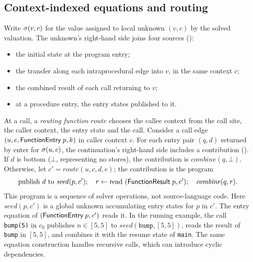 \subsection{Context-indexed equations and routing}

Write $\sigma(v,c)$ for the value assigned to local unknown $(v,c)$ by the
solved valuation. The unknown's right-hand side joins four sources ():
\begin{itemize}
  \item the initial state at the program entry;
  \item the transfer along each intraprocedural edge into $v$, in the same
    context $c$;
  \item the combined result of each call returning to $v$;
  \item at a procedure entry, the entry states published to it.
\end{itemize}
At a call, a \emph{routing function} $\mathit{route}$ chooses the callee
context from the call site, the caller context, the entry state and the call.
Consider a call edge $(u, e, \textsf{FunctionEntry}\;p, k)$ in caller context
$c$. For each entry pair $(q, d)$ returned by enter for $\sigma(u, c)$, the
continuation's right-hand side includes a contribution
(). If $d$ is bottom
($\bot$, representing no stores), the
contribution is $\mathit{combine}(q, \bot)$. Otherwise, let
$c' = \mathit{route}(u, c, d, e)$; the contribution is the program
\[
\text{publish } d \text{ to } \mathit{seed}(p, c');\quad
r \leftarrow \text{read } (\textsf{FunctionResult}\;p, c');\quad
\mathit{combine}(q, r).
\]
This program is a sequence of solver operations, not source-language code.
Here $\mathit{seed}(p,c')$ is a global unknown accumulating entry states for
$p$ in $c'$. The entry equation of $(\textsf{FunctionEntry}\;p, c')$ reads it.
In the running example, the call \texttt{bump(5)} in
$c_0$ publishes $n \in [5,5]$ to $\mathit{seed}(\texttt{bump}, [5,5])$, reads
the result of \texttt{bump} in $[5,5]$, and combines it with the resume state
of \texttt{main}. The same equation construction handles recursive calls,
which can introduce cyclic dependencies.

